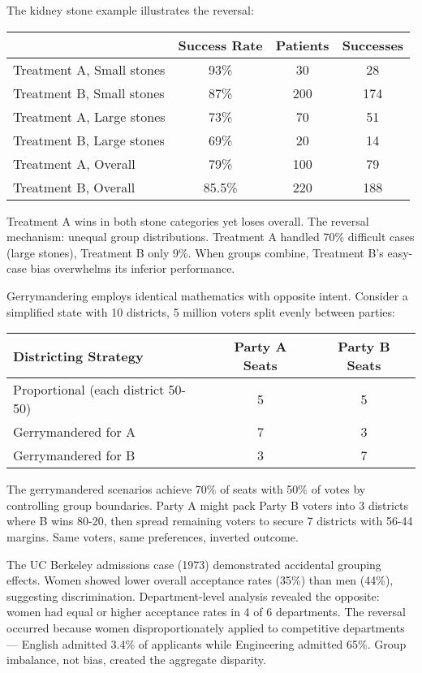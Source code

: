 The kidney stone example illustrates the reversal:

\begin{center}
\begin{tabular}{lccc}
\toprule
 & Success Rate & Patients & Successes \\
\midrule
Treatment A, Small stones & 93\% & 30 & 28 \\
Treatment B, Small stones & 87\% & 200 & 174 \\
Treatment A, Large stones & 73\% & 70 & 51 \\
Treatment B, Large stones & 69\% & 20 & 14 \\
\midrule
Treatment A, Overall & 79\% & 100 & 79 \\
Treatment B, Overall & 85.5\% & 220 & 188 \\
\bottomrule
\end{tabular}
\end{center}

Treatment A wins in both stone categories yet loses overall. The reversal mechanism: unequal group distributions. Treatment A handled 70\% difficult cases (large stones), Treatment B only 9\%. When groups combine, Treatment B's easy-case bias overwhelms its inferior performance.

Gerrymandering employs identical mathematics with opposite intent. Consider a simplified state with 10 districts, 5 million voters split evenly between parties:

\begin{center}
\begin{tabular}{lcc}
\toprule
Districting Strategy & Party A Seats & Party B Seats \\
\midrule
Proportional (each district 50-50) & 5 & 5 \\
Gerrymandered for A & 7 & 3 \\
Gerrymandered for B & 3 & 7 \\
\bottomrule
\end{tabular}
\end{center}

The gerrymandered scenarios achieve 70\% of seats with 50\% of votes by controlling group boundaries. Party A might pack Party B voters into 3 districts where B wins 80-20, then spread remaining voters to secure 7 districts with 56-44 margins. Same voters, same preferences, inverted outcome.

The UC Berkeley admissions case (1973) demonstrated accidental grouping effects. Women showed lower overall acceptance rates (35\%) than men (44\%), suggesting discrimination. Department-level analysis revealed the opposite: women had equal or higher acceptance rates in 4 of 6 departments. The reversal occurred because women disproportionately applied to competitive departments — English admitted 3.4\% of applicants while Engineering admitted 65\%. Group imbalance, not bias, created the aggregate disparity.

